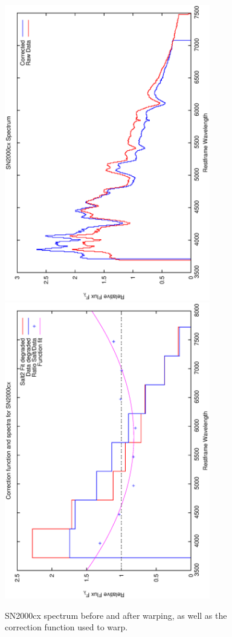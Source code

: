 \clearpage

\begin{figure}[p]
\centering
\includegraphics[angle=-90,width=0.8\textwidth]{./figures/spectrabeforeafter/SN2000cx_handpicked_v001_v024_before_after_spectra.ps}
\hfill
\includegraphics[angle=-90,width=0.8\textwidth]{./figures/corrections/SN2000cx_v001_correction.ps}
\hfill
\caption{SN2000cx spectrum before and after warping, as well as the correction function used to warp.}
\label{fig:SN2000cxfour1}
\end{figure}

